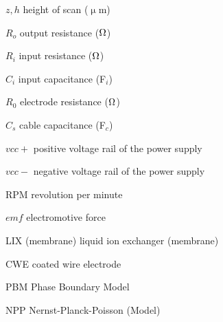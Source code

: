 $z, h$ \dotfill height of scan ($\upmu$m)

$R_o$ \dotfill output resistance ($\ohm$)

$R_i$ \dotfill input resistance ($\ohm$)

$C_i$ \dotfill input capacitance (F$_i$)

$R_0$ \dotfill electrode resistance ($\ohm$)

$C_s$ \dotfill cable capacitance (F$_c$)

$vcc+$ \dotfill positive voltage rail of the power supply

$vcc-$ \dotfill negative voltage rail of the power supply

RPM \dotfill revolution per minute

$emf$ \dotfill electromotive force

LIX (membrane) \dotfill liquid ion exchanger (membrane)

CWE \dotfill coated wire electrode

PBM \dotfill Phase Boundary Model

NPP \dotfill Nernst-Planck-Poisson (Model)
